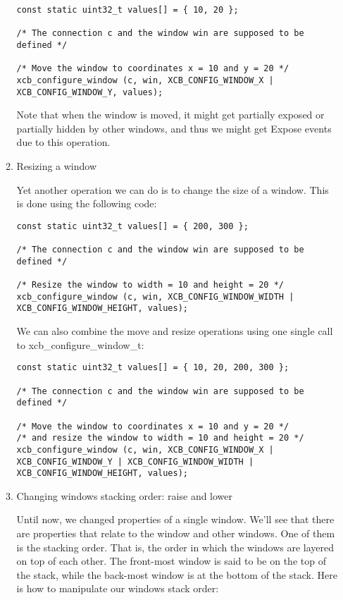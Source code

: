 \documentclass[12pt,oneside,titlepage]{book}
\begin{document}
\begin{enumerate}
\begin{enumerate}
\begin{verbatim}
const static uint32_t values[] = { 10, 20 };

/* The connection c and the window win are supposed to be defined */

/* Move the window to coordinates x = 10 and y = 20 */
xcb_configure_window (c, win, XCB_CONFIG_WINDOW_X | XCB_CONFIG_WINDOW_Y, values);
\end{verbatim}

    Note that when the window is moved, it might get partially exposed
    or partially hidden by other windows, and thus we might get {Expose}
    events due to this operation.
  \item
    \protect\hypertarget{winsize}{}{Resizing a window}

    Yet another operation we can do is to change the size of a window.
    This is done using the following code:

\begin{verbatim}
const static uint32_t values[] = { 200, 300 };

/* The connection c and the window win are supposed to be defined */

/* Resize the window to width = 10 and height = 20 */
xcb_configure_window (c, win, XCB_CONFIG_WINDOW_WIDTH | XCB_CONFIG_WINDOW_HEIGHT, values);
\end{verbatim}

    We can also combine the move and resize operations using one single
    call to {xcb\_configure\_window\_t}:

\begin{verbatim}
const static uint32_t values[] = { 10, 20, 200, 300 };

/* The connection c and the window win are supposed to be defined */

/* Move the window to coordinates x = 10 and y = 20 */
/* and resize the window to width = 10 and height = 20 */
xcb_configure_window (c, win, XCB_CONFIG_WINDOW_X | XCB_CONFIG_WINDOW_Y | XCB_CONFIG_WINDOW_WIDTH | XCB_CONFIG_WINDOW_HEIGHT, values);
\end{verbatim}
  \item
    \protect\hypertarget{winstack}{}{Changing windows stacking order:
    raise and lower}

    Until now, we changed properties of a single window. We'll see that
    there are properties that relate to the window and other windows.
    One of them is the stacking order. That is, the order in which the
    windows are layered on top of each other. The front-most window is
    said to be on the top of the stack, while the back-most window is at
    the bottom of the stack. Here is how to manipulate our windows stack
    order:


\end{enumerate}
\end{enumerate}
\end{document}
